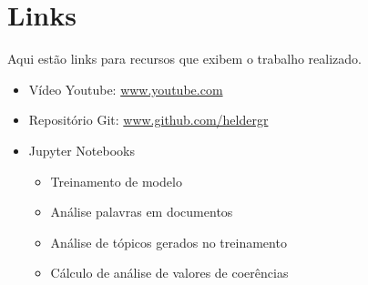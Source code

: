 \section{Links}

Aqui estão links para recursos que exibem o trabalho realizado.

\begin{itemize}
    \item Vídeo Youtube: \url{www.youtube.com}
    \item Repositório Git: \url{www.github.com/heldergr}
    \item Jupyter Notebooks
        \begin{itemize}
            \item Treinamento de modelo
            \item Análise palavras em documentos
            \item Análise de tópicos gerados no treinamento
            \item Cálculo de análise de valores de coerências
        \end{itemize}
\end{itemize}